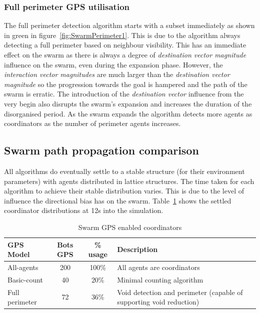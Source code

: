 \subsubsection{Full perimeter GPS utilisation\label{section:SwarmPerimeter4}}
The full perimeter detection algorithm starts with a subset immediately as shown in green in figure~\ref{fig:SwarmPerimeter1}. This is due to the algorithm always detecting a full perimeter based on neighbour visibility. This has an immediate effect on the swarm as there is always a degree of \textit{destination vector magnitude} influence on the swarm, even during the expansion phase. However, the \textit{interaction vector magnitudes} are much larger than the \textit{destination vector magnitude} so the progression towards the goal is hampered and the path of the swarm is erratic. The introduction of the \textit{destination vector} influence from the very begin also disrupts the swarm's expansion and increases the duration of the disorganised period. As the swarm expands the algorithm detects more agents as coordinators as the number of perimeter agents increases.

\subsection{Swarm path propagation comparison\label{section:compareBaselineAll2}}
All algorithms do eventually settle to a stable structure (for their environment parameters) with agents distributed in lattice structures. The time taken for each algorithm to achieve their stable distribution varies. This is due to the level of influence the directional bias has on the swarm. Table~\ref{tab:GPSUsage} shows the settled coordinator distributions at 12s into the simulation.

\begin{table}[H]
\begin{center}
\begin{tabular}{| p{2.5cm} | c | c | p{5cm} |}
\hline
GPS Model & Bots GPS & \% usage & Description \\ \hline
All-agents & 200 & 100\% & All agents are coordinators \\ \hline
Basic-count & 40 & 20\% & Minimal counting algorithm\\ \hline
Full perimeter & 72 & 36\% & Void detection and perimeter (capable of supporting void reduction)\\  \hline
\end{tabular}\caption{Swarm GPS enabled coordinators} \label{tab:GPSUsage}
\end{center}
\end{table}

